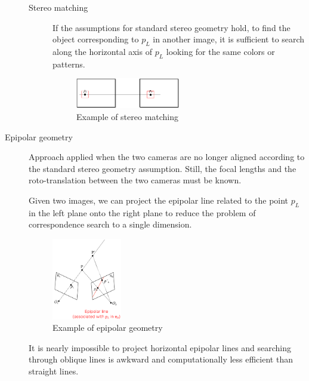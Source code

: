 \begin{description}
        \begin{description}
            \item[Stereo matching] 
                If the assumptions for standard stereo geometry hold,
                to find the object corresponding to $p_L$ in another image, 
                it is sufficient to search along the horizontal axis of $p_L$ looking for the same colors or patterns.

                \begin{figure}[h]
                    \centering
                    \includegraphics[width=0.5\textwidth]{./img/stereo_matching.png}
                    \caption{Example of stereo matching}
                \end{figure}
        \end{description}

    \item[Epipolar geometry] 
        Approach applied when the two cameras are no longer aligned according to the standard stereo geometry assumption.
        Still, the focal lengths and the roto-translation between the two cameras must be known.

        Given two images, we can project the epipolar line related to the point $p_L$ in the left plane onto the right plane
        to reduce the problem of correspondence search to a single dimension.

        \begin{figure}[H]
            \centering
            \includegraphics[width=0.3\textwidth]{./img/_epipolar_geometry.pdf}
            \caption{Example of epipolar geometry}
        \end{figure}

        \begin{remark}
            It is nearly impossible to project horizontal epipolar lines and 
            searching through oblique lines is awkward and computationally less efficient than straight lines.
        \end{remark}


\end{description}
